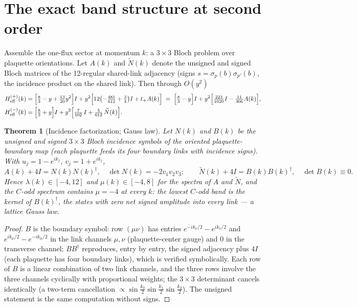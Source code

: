 \documentclass[11pt]{article}
\newtheorem{theorem}{Theorem}[section]
\newcommand{\Nt}{\widetilde N}
\begin{document}
\section{The exact band structure at second order}
\label{sec:band}

Assemble the one-flux sector at momentum $k$: a $3\times3$ Bloch problem over
plaquette orientations. Let $A(k)$ and $\Nt(k)$ denote the unsigned and
signed Bloch matrices of the 12-regular shared-link adjacency (signs
$s=\sigma_p(b)\sigma_{p'}(b)$, the incidence product on the shared link).
Then through $O(y^2)$
\begin{align}
H^{(+)}_{\mathrm{eff}}(k) &= \Bigl[\tfrac83-y+\tfrac{13}{20}y^2\Bigr] I
+ y^2\Bigl[12\bigl(-\tfrac{481}{612}+\tfrac34\bigr) I + t_+ A(k)\Bigr]
\;=\;\Bigl[\tfrac83-y\Bigr]I + y^2\Bigl[\tfrac{223}{1020}I
-\tfrac{11}{306}A(k)\Bigr],
\label{eq:Heven}\\
H^{(-)}_{\mathrm{eff}}(k) &= \Bigl[\tfrac83+y\Bigr] I
+ y^2\Bigl[\tfrac{7}{102}\,I+\tfrac{5}{612}\,\Nt(k)\Bigr].
\label{eq:Hodd}
\end{align}

\begin{theorem}[Incidence factorization; Gauss law]\label{thm:gausslaw}
Let $N(k)$ and $B(k)$ be the unsigned and signed $3\times3$ Bloch incidence
symbols of the oriented plaquette-boundary map (each plaquette feeds its four
boundary links with incidence signs). With $u_j=1-e^{ik_j}$,
$v_j=1+e^{ik_j}$,
\begin{equation}
A(k)+4I=N(k)N(k)^\dagger,\quad \det N(k)=-2v_1v_2v_3;
\qquad
\Nt(k)+4I=B(k)B(k)^\dagger,\quad \det B(k)\equiv0 .
\end{equation}
Hence $\lambda(k)\in[-4,12]$ and $\mu(k)\in[-4,8]$ for the spectra of $A$
and $\Nt$, and the $C$-odd spectrum contains $\mu=-4$ \emph{at every} $k$:
the lowest $C$-odd band is the kernel of $B(k)^\dagger$, the states with zero
net signed amplitude into every link --- a lattice Gauss law.
\end{theorem}

\begin{proof}
$B$ is the boundary symbol: row $(\mu\nu)$ has entries
$e^{-ik_\nu/2}-e^{ik_\nu/2}$ and $e^{ik_\mu/2}-e^{-ik_\mu/2}$ in the link
channels $\mu,\nu$ (plaquette-center gauge) and $0$ in the transverse
channel; $BB^\dagger$ reproduces, entry by entry, the signed adjacency plus
$4I$ (each plaquette has four boundary links), which is verified symbolically.
Each row of $B$ is a linear combination of two link channels, and the three
rows involve the three channels cyclically with proportional weights; the
$3\times3$ determinant cancels identically (a two-term cancellation
$\propto \sin\tfrac{k_0}{2}\sin\tfrac{k_1}{2}\sin\tfrac{k_2}{2}$). The unsigned statement is the
same computation without signs.
\end{proof}
\end{document}
